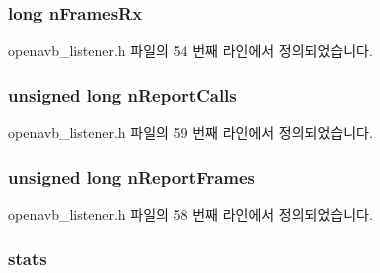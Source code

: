 \subsubsection[{\texorpdfstring{n\+Frames\+Rx}{nFramesRx}}]{\setlength{\rightskip}{0pt plus 5cm}long n\+Frames\+Rx}\hypertarget{structlistener__data__t_a4d0ba87ab9f36db73f5e9411f36d530c}{}\label{structlistener__data__t_a4d0ba87ab9f36db73f5e9411f36d530c}


openavb\+\_\+listener.\+h 파일의 54 번째 라인에서 정의되었습니다.

\subsubsection[{\texorpdfstring{n\+Report\+Calls}{nReportCalls}}]{\setlength{\rightskip}{0pt plus 5cm}unsigned long n\+Report\+Calls}\hypertarget{structlistener__data__t_a84898187f451ec315f2da98794da5cd7}{}\label{structlistener__data__t_a84898187f451ec315f2da98794da5cd7}


openavb\+\_\+listener.\+h 파일의 59 번째 라인에서 정의되었습니다.

\subsubsection[{\texorpdfstring{n\+Report\+Frames}{nReportFrames}}]{\setlength{\rightskip}{0pt plus 5cm}unsigned long n\+Report\+Frames}\hypertarget{structlistener__data__t_a212b085a1e0d5676fceeb1aa16c045a4}{}\label{structlistener__data__t_a212b085a1e0d5676fceeb1aa16c045a4}


openavb\+\_\+listener.\+h 파일의 58 번째 라인에서 정의되었습니다.

\subsubsection[{\texorpdfstring{stats}{stats}}]{ stats}\hypertarget{structlistener__data__t_a7de4f08e6db1ce952196ec3a7ed358f1}{}\label{structlistener__data__t_a7de4f08e6db1ce952196ec3a7ed358f1}


